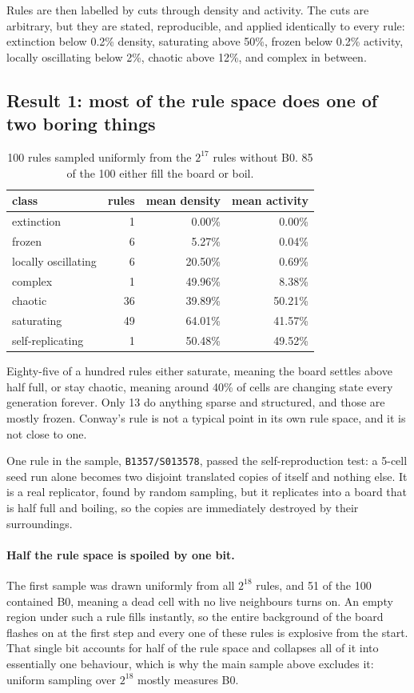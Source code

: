 \documentclass[11pt]{article}
\newcommand{\rulename}[1]{\texttt{#1}}
\begin{document}
Rules are then labelled by cuts through density and activity. The cuts are arbitrary, but they are
stated, reproducible, and applied identically to every rule: extinction below 0.2\% density,
saturating above 50\%, frozen below 0.2\% activity, locally oscillating below 2\%, chaotic above
12\%, and complex in between.

\subsection{Result 1: most of the rule space does one of two boring things}

\begin{table}[h]
\centering
\small
\begin{tabular}{lrrr}
\toprule
class & rules & mean density & mean activity \\
\midrule
extinction & 1 & 0.00\% & 0.00\% \\
frozen & 6 & 5.27\% & 0.04\% \\
locally oscillating & 6 & 20.50\% & 0.69\% \\
complex & 1 & 49.96\% & 8.38\% \\
chaotic & 36 & 39.89\% & 50.21\% \\
saturating & 49 & 64.01\% & 41.57\% \\
self-replicating & 1 & 50.48\% & 49.52\% \\
\bottomrule
\end{tabular}
\caption{100 rules sampled uniformly from the $2^{17}$ rules without B0. 85 of the 100 either fill
the board or boil.}
\end{table}

Eighty-five of a hundred rules either saturate, meaning the board settles above half full, or stay
chaotic, meaning around 40\% of cells are changing state every generation forever. Only 13 do
anything sparse and structured, and those are mostly frozen. Conway's rule is not a typical point in
its own rule space, and it is not close to one.

One rule in the sample, \rulename{B1357/S013578}, passed the self-reproduction test: a 5-cell seed
run alone becomes two disjoint translated copies of itself and nothing else. It is a real
replicator, found by random sampling, but it replicates into a board that is half full and boiling,
so the copies are immediately destroyed by their surroundings.

\paragraph{Half the rule space is spoiled by one bit.} The first sample was drawn uniformly from all
$2^{18}$ rules, and 51 of the 100 contained B0, meaning a dead cell with no live neighbours turns on.
An empty region under such a rule fills instantly, so the entire background of the board flashes on
at the first step and every one of these rules is explosive from the start. That single bit accounts
for half of the rule space and collapses all of it into essentially one behaviour, which is why the
main sample above excludes it: uniform sampling over $2^{18}$ mostly measures B0.
\end{document}
